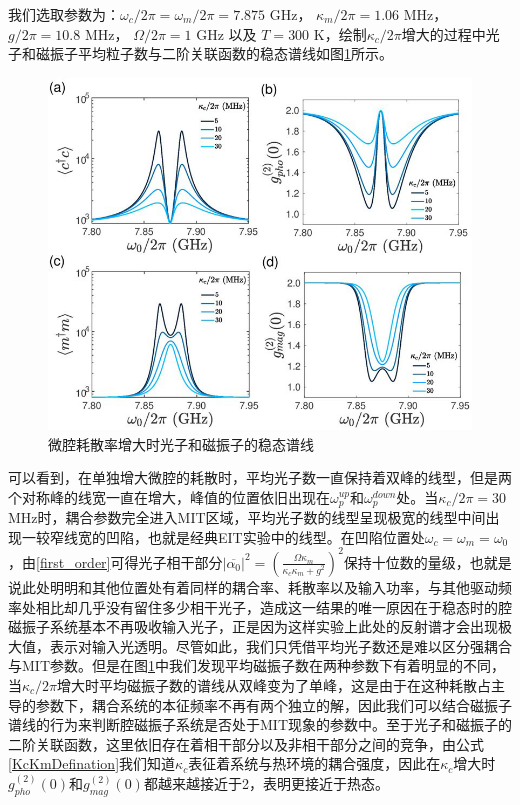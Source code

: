 我们选取参数为：$\omega_c/2\pi=\omega_m/2\pi=7.875$ GHz， $\kappa_m/2\pi=1.06$ MHz， $g/2\pi=10.8$ MHz， $\Omega/2\pi=1$ GHz 以及 $T=300$ K，绘制$\kappa_c/2\pi$增大的过程中光子和磁振子平均粒子数与二阶关联函数的稳态谱线如图\ref{MITkcVary}所示。
\begin{figure}[htbp]
	\centering
	\includegraphics[width=2.1\basefigurewidth,clip]{./figure/4_5}
	\caption{微腔耗散率增大时光子和磁振子的稳态谱线} 
	\label{MITkcVary}
\end{figure}
可以看到，在单独增大微腔的耗散时，平均光子数一直保持着双峰的线型，但是两个对称峰的线宽一直在增大，峰值的位置依旧出现在$\omega_p^{up}$和$\omega_p^{down}$处。当$\kappa_c/2\pi=30$MHz时，耦合参数完全进入MIT区域，平均光子数的线型呈现极宽的线型中间出现一较窄线宽的凹陷，也就是经典EIT实验中的线型。在凹陷位置处$\omega_c=\omega_m=\omega_0$，由\eqref{first_order}可得光子相干部分$|\overline{\alpha_{0}}|^2 = \left(\frac{\Omega\kappa_{m}}{\kappa_{c}\kappa_{m}+g^{2}}\right)^2$保持十位数的量级，也就是说此处明明和其他位置处有着同样的耦合率、耗散率以及输入功率，与其他驱动频率处相比却几乎没有留住多少相干光子，造成这一结果的唯一原因在于稳态时的腔磁振子系统基本不再吸收输入光子，正是因为这样实验上此处的反射谱才会出现极大值，表示对输入光透明。尽管如此，我们只凭借平均光子数还是难以区分强耦合与MIT参数。但是在图\ref{MITkcVary}中我们发现平均磁振子数在两种参数下有着明显的不同，当$\kappa_c/2\pi$增大时平均磁振子数的谱线从双峰变为了单峰，这是由于在这种耗散占主导的参数下，耦合系统的本征频率不再有两个独立的解，因此我们可以结合磁振子谱线的行为来判断腔磁振子系统是否处于MIT现象的参数中。至于光子和磁振子的二阶关联函数，这里依旧存在着相干部分以及非相干部分之间的竞争，由公式\eqref{KcKmDefination}我们知道$\kappa_c$表征着系统与热环境的耦合强度，因此在$\kappa_c$增大时$g_{pho}^{(2)}(0)$和$g_{mag}^{(2)}(0)$都越来越接近于2，表明更接近于热态。

